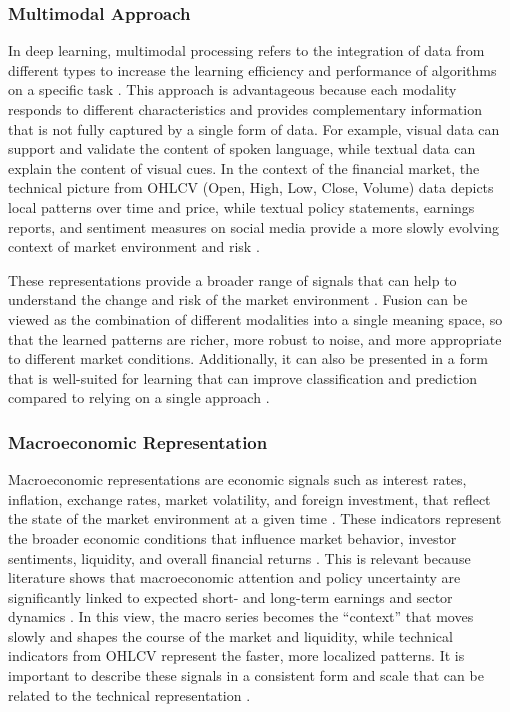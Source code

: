 \subsubsection*{Multimodal Approach}
In deep learning, multimodal processing refers to the integration of data from different types to increase the learning efficiency and performance of algorithms on a specific task \cite{dimitri2022short}. This approach is advantageous because each modality responds to different characteristics and provides complementary information that is not fully captured by a single form of data. For example, visual data can support and validate the content of spoken language, while textual data can explain the content of visual cues. In the context of the financial market, the technical picture from OHLCV (Open, High, Low, Close, Volume) data depicts local patterns over time and price, while textual policy statements, earnings reports, and sentiment measures on social media provide a more slowly evolving context of market environment and risk \cite{farimani2024adaptive,karadacs2025multimodal}.

These representations provide a broader range of signals that can help to understand the change and risk of the market environment \cite{zhang2020multimodal}. Fusion can be viewed as the combination of different modalities into a single meaning space, so that the learned patterns are richer, more robust to noise, and more appropriate to different market conditions. Additionally, it can also be presented in a form that is well-suited for learning that can improve classification and prediction compared to relying on a single approach \cite{gallo2018image}. 

\subsubsection*{Macroeconomic Representation}
Macroeconomic representations are economic signals such as interest rates, inflation, exchange rates, market volatility, and foreign investment, that reflect the state of the market environment at a given time \cite{artantacs2020selected}. These indicators represent the broader economic conditions that influence market behavior, investor sentiments, liquidity, and overall financial returns \cite{Naik02012024,mazumder2025impact}. This is relevant because literature shows that macroeconomic attention and policy uncertainty are significantly linked to expected short- and long-term earnings and sector dynamics \cite{ma2022macroeconomic}. In this view, the macro series becomes the “context” that moves slowly and shapes the course of the market and liquidity, while technical indicators from OHLCV represent the faster, more localized patterns. It is important to describe these signals in a consistent form and scale that can be related to the technical representation \cite{wang2019aggregating}.

